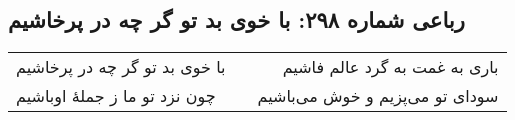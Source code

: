 \begin{center}
\section*{رباعی شماره ۲۹۸: با خوی بد تو گر چه در پرخاشیم}
\label{sec:sh298}
\begin{longtable}{l p{0.5cm} r}
با خوی بد تو گر چه در پرخاشیم
&&
باری به غمت به گرد عالم فاشیم
\\
چون نزد تو ما ز جملهٔ اوباشیم
&&
سودای تو می‌پزیم و خوش می‌باشیم
\\
\end{longtable}
\end{center}

